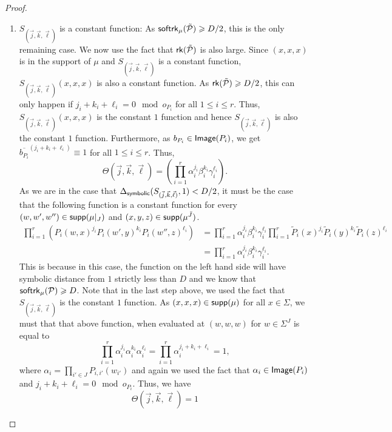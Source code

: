 \documentclass[11pt]{article}
\renewcommand\geq{\geqslant}
\renewcommand\leq{\leqslant}
\begin{document}
\begin{proof}
\begin{enumerate}
        \item[(c)]  $S_{(\vec{j}, \vec{k}, \vec{\ell})}$ is a constant function: As ${\sf softrk}_{\mu}(\tilde{\mathcal{P}})\geq D/2$, this is the only remaining case. We now use the fact that ${\sf rk}(\tilde{\mathcal{P}})$ is also large. Since $(x, x, x)$ is in the support of $\mu$ and $S_{(\vec{j}, \vec{k}, \vec{\ell})}$ is a constant function, $S_{(\vec{j}, \vec{k}, \vec{\ell})}(x, x, x)$ is also a constant function. As ${\sf rk}(\tilde{\mathcal{P}})\geq D/2$, this can only happen if $j_i+k_i+\ell_i = 0 \mod o_{P_{i}}$ for all $1\leq i\leq r$. Thus, $S_{(\vec{j}, \vec{k}, \vec{\ell})}(x, x, x)$ is the constant $1$ function and hence $S_{(\vec{j}, \vec{k}, \vec{\ell})}$ is also the constant $1$ function. Furthermore, as $b_{P_i}\in {\sf Image}(P_i)$, we get $\overline{b_{P_i}}^{(j_i +k_i+\ell_i)}\equiv 1$ for all $1\leq i\leq r$. Thus, 
         $$\Theta(\vec{j}, \vec{k}, \vec{\ell}) =  \left(\prod_{i=1}^r\alpha_i^{j_i} \beta_i^{k_i} \gamma_i^{\ell_i}\right).$$
         As we are in the case that $\Delta_{{\sf symbolic}}(S_{(\vec{j}, \vec{k}, \vec{\ell})},1)< D/2$, it must be the case that the following function is a constant function for every $(w, w', w'') \in {\sf supp}(\mu|_{J})$ and $(x, y, z)\in {\sf supp}(\mu^{\bar{J}})$.
         \begin{align*}
         \prod_{i=1}^r \left( P_i(w,x)^{j_i} P_i(w',y)^{k_i} P_i(w'',z)^{\ell_i}\right) &=\prod_{i=1}^r  \alpha_i^{j_i} \beta_i^{k_i} \gamma_i^{\ell_i} \prod_{i=1}^r \tilde{P}_i(x)^{j_i} \tilde{P}_i(y)^{k_i} \tilde{P}_i(z)^{\ell_i}\\
         & = \prod_{i=1}^r  \alpha_i^{j_i} \beta_i^{k_i} \gamma_i^{\ell_i}.
         \end{align*}
         This is because in this case, the function on the left hand side will have symbolic distance from $1$ strictly less than $D$ and we know that ${\sf softrk}_{\mu}(\mathcal{P})\geq D$. Note that in the last step above, we used the fact that $S_{(\vec{j}, \vec{k}, \vec{\ell})}$ is the constant $1$ function. As $(x, x, x)\in {\sf supp}(\mu)$ for all $x\in \Sigma$, we must that that above function, when evaluated at $(w, w, w)$  for $w\in \Sigma^{J}$ is equal to 
          $$\prod_{i=1}^r  \alpha_i^{j_i} \alpha_i^{k_i} \alpha_i^{\ell_i} = \prod_{i=1}^r  \alpha_i^{{j_i}+{k_i} +{\ell_i}} = 1,$$
          where $\alpha_i = \prod_{i'\in J} P_{i,i'}(w_{i'})$ and again we used the fact that $\alpha_i\in {\sf Image}(P_i)$ and ${j_i}+{k_i} +{\ell_i} = 0 \mod o_{P_{i}}$. Thus, we have 
%
          $$\Theta(\vec{j}, \vec{k}, \vec{\ell}) = 1$$

\end{enumerate}
\end{proof}
\end{document}
